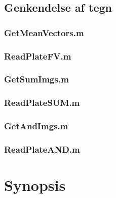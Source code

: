 \documentclass[11pt,a4paper,final]{article}
\begin{document}
\subsection{Genkendelse af tegn}
\subsubsection{GetMeanVectors.m}
\label{code:GetMeanVectors}


\subsubsection{ReadPlateFV.m}
\label{code:ReadPlateFV}


\subsubsection{GetSumImgs.m}
\label{code:GetSumImgs}


\subsubsection{ReadPlateSUM.m}
\label{code:ReadPlateSUM}


\subsubsection{GetAndImgs.m}
\label{code:GetAndImgs}


\subsubsection{ReadPlateAND.m}
\label{code:ReadPlateAND}





\newpage
\section{Synopsis}

\end{document}
